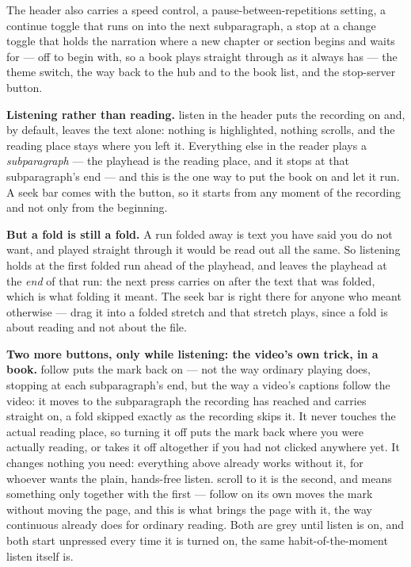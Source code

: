 \documentclass[11pt,oneside]{report}
\newcommand{\key}[1]{\textsf{\small\fbox{#1}}}
\newcommand{\menu}[1]{\textsf{#1}}
\begin{document}
The header also carries a speed control, a pause-between-repetitions
setting, a \menu{continue} toggle that runs on into the next subparagraph, a
\menu{stop at a change} toggle that holds the narration where a new chapter or
section begins and waits for \key{space} --- off to begin with, so a book
plays straight through as it always has --- the theme switch, the way back to
the hub and to the book list, and the stop-server button.

\textbf{Listening rather than reading.} \menu{listen} in the header puts the
recording on and, by default, leaves the text alone: nothing is highlighted,
nothing scrolls, and the reading place stays where you left it. Everything
else in the reader plays a \emph{subparagraph} --- the playhead is the
reading place, and it stops at that subparagraph's end --- and this is the
one way to put the book on and let it run. A seek bar comes with the button,
so it starts from any moment of the recording and not only from the
beginning.

\textbf{But a fold is still a fold.} A run folded away is text you have said
you do not want, and played straight through it would be read out all the
same. So listening holds at the first folded run ahead of the playhead, and
leaves the playhead at the \emph{end} of that run: the next press carries on
after the text that was folded, which is what folding it meant. The seek bar is
right there for anyone who meant otherwise --- drag it into a folded stretch
and that stretch plays, since a fold is about reading and not about the file.

\textbf{Two more buttons, only while listening: the video's own trick, in a
book.} \menu{follow} puts the mark back on --- not the way ordinary playing
does, stopping at each subparagraph's end, but the way a video's captions
follow the video: it moves to the subparagraph the recording has reached and
carries straight on, a fold skipped exactly as the recording skips it. It
never touches the actual reading place, so turning it off puts the mark back
where you were actually reading, or takes it off altogether if you had not
clicked anywhere yet. It changes nothing you need: everything above already
works without it, for whoever wants the plain, hands-free listen.
\menu{scroll to it} is the second, and means something only together with the
first --- \menu{follow} on its own moves the mark without moving the page,
and this is what brings the page with it, the way \menu{continuous} already
does for ordinary reading. Both are grey until \menu{listen} is on, and both
start unpressed every time it is turned on, the same habit-of-the-moment
\menu{listen} itself is.
\end{document}
